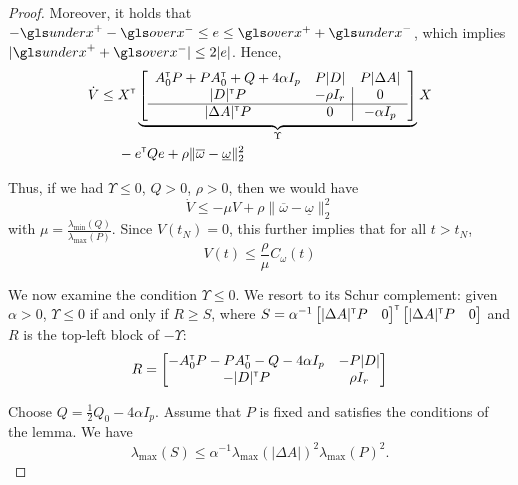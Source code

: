 \begin{subappendices}
\begin{proof}
		Moreover, it holds that $-\ux^+ -\ox^- \leq e \leq \ox^+ + \ux^-$, which implies $|\ux^+ + \ox^-| \leq 2 |e|$. Hence,
		\begin{align*}
		\dot{V} \leq {}& X^{\mathsf{\scriptscriptstyle T}}
		\underbrace{
			\left[
			\begin{array}{cc|c}
			A_0^{\mathsf{\scriptscriptstyle T}} P + P A_0^{\mathsf{\scriptscriptstyle T}} + Q + 4\alpha I_p & P|D| & P|\Delta A| \\
			|D|^{\mathsf{\scriptscriptstyle T}} P & -\rho I_r & 0\\
			\hline
			|\Delta A|^{\mathsf{\scriptscriptstyle T}} P & 0 & -\alpha I_p
			\end{array}
			\right]}_{\Upsilon}
		X\\
		& - e^{\mathsf{\scriptscriptstyle T}} Q e + \rho \|\overline{\omega} - \underline{\omega}\|_2^2
		\end{align*}
		
		Thus, if we had $\Upsilon \leq 0$, $Q>0$, $\rho > 0$, then we would have
		\[
		\dot{V} \leq -\mu V + \rho \|\overline{\omega} - \underline{\omega}\|_2^2
		\]
		with $\mu = \frac{\lambda_{\min}(Q)}{\lambda_{\max}(P)}$. Since $V(t_N) = 0$, this further implies that for all $t>t_N$, 
		\begin{equation}
		\label{eq:lyap-bound}
		V(t) \leq \frac{\rho}{\mu} C_\omega(t)
		\end{equation}
		
		We now examine the condition $\Upsilon \leq 0$.
		We resort to its Schur complement: given $\alpha > 0$, $\Upsilon \leq 0$ if and only if $R \geq S$, where $S= \alpha^{-1}\begin{bmatrix}|\Delta A|^{\mathsf{\scriptscriptstyle T}} P & 0\end{bmatrix}^{\mathsf{\scriptscriptstyle T}} \begin{bmatrix}|\Delta A|^{\mathsf{\scriptscriptstyle T}} P & 0\end{bmatrix}$ and $R$ is the top-left block of $-\Upsilon$:
		\[R = \begin{bmatrix}
		-A_0^{\mathsf{\scriptscriptstyle T}} P - P A_0^{\mathsf{\scriptscriptstyle T}} - Q - 4\alpha I_p & -P|D|\\
		-|D|^{\mathsf{\scriptscriptstyle T}} P & \rho I_r\\
		\end{bmatrix}\]
		
		Choose $Q = \frac{1}{2}Q_0-4\alpha I_p$.
		Assume that $P$ is fixed and satisfies the conditions of the lemma. We have $$\lambda_{\max}(S) \leq \alpha^{-1}\lambda_{\max}(|\Delta A|)^2\lambda_{\max}(P)^2.$$
		

\end{proof}
\end{subappendices}
